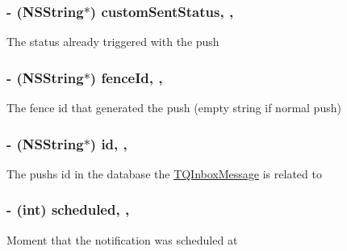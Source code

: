 \subsubsection[{custom\+Sent\+Status}]{\setlength{\rightskip}{0pt plus 5cm}-\/ (N\+S\+String$\ast$) custom\+Sent\+Status\hspace{0.3cm}{\ttfamily [read]}, {\ttfamily [atomic]}, {\ttfamily [assign]}}\label{interface_t_q_inbox_message_a733ac6a53d04d9f8844438eae605cb76}
The status already triggered with the push \hypertarget{interface_t_q_inbox_message_a167f2aee91be99c0ce08f980b80a0dba}{}
\subsubsection[{fence\+Id}]{\setlength{\rightskip}{0pt plus 5cm}-\/ (N\+S\+String$\ast$) fence\+Id\hspace{0.3cm}{\ttfamily [read]}, {\ttfamily [atomic]}, {\ttfamily [assign]}}\label{interface_t_q_inbox_message_a167f2aee91be99c0ce08f980b80a0dba}
The fence id that generated the push (empty string if normal push) \hypertarget{interface_t_q_inbox_message_a21a1990209c33c87dea6e82fb9878a29}{}
\subsubsection[{id}]{\setlength{\rightskip}{0pt plus 5cm}-\/ (N\+S\+String$\ast$) id\hspace{0.3cm}{\ttfamily [read]}, {\ttfamily [atomic]}, {\ttfamily [assign]}}\label{interface_t_q_inbox_message_a21a1990209c33c87dea6e82fb9878a29}
The push\textquotesingle{}s id in the database the \hyperlink{interface_t_q_inbox_message}{T\+Q\+Inbox\+Message} is related to \hypertarget{interface_t_q_inbox_message_ad3ce8614fde9e7464af00f76bb59d685}{}
\subsubsection[{scheduled}]{\setlength{\rightskip}{0pt plus 5cm}-\/ (int) scheduled\hspace{0.3cm}{\ttfamily [read]}, {\ttfamily [atomic]}, {\ttfamily [assign]}}\label{interface_t_q_inbox_message_ad3ce8614fde9e7464af00f76bb59d685}
Moment that the notification was scheduled at \hypertarget{interface_t_q_inbox_message_aef995a499d691cd27c255f59d68ec829}{}
